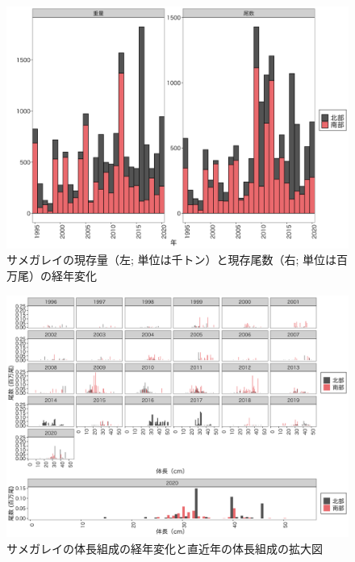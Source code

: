 \documentclass[11pt]{article} %
\begin{document}
\begin{linenumbers}
\begin{figure}[h]
  \centering
  \includegraphics[width = 14cm]{サメガレイtrend.png}
  \caption{サメガレイの現存量（左; 単位は千トン）と現存尾数（右; 単位は百万尾）の経年変化}
\end{figure}

\begin{figure}[h]
  \centering
  \includegraphics[width = 14cm]{サメガレイlength.png}
  \caption{サメガレイの体長組成の経年変化と直近年の体長組成の拡大図}
\end{figure}


\end{linenumbers}
\end{document}
